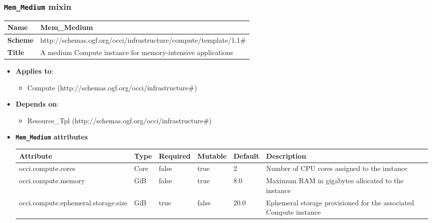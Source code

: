  
\subsubsection{\texttt{Mem\_Medium} mixin}
\begin{center}
\begin{tabular}{|l|l|}
  \hline
  \textbf{Name} & Mem\_Medium \\
  \hline  
  \textbf{Scheme} & http://schemas.ogf.org/occi/infrastructure/compute/template/1.1\# \\
  \hline
  \textbf{Title} & A medium Compute instance for memory-intensive applications \\
  \hline
\end{tabular}
\end{center}
\begin{itemize}
\item \textbf{Applies to}:
\begin{itemize}
	\item Compute (http://schemas.ogf.org/occi/infrastructure\#)
\end{itemize}
\end{itemize} 
\begin{itemize}
\item \textbf{Depends on}:
\begin{itemize}
	\item Resource\_Tpl (http://schemas.ogf.org/occi/infrastructure\#)
\end{itemize}
\end{itemize}

\begin{itemize}
\item \textbf{\texttt{Mem\_Medium} attributes}

\begin{tabularx}{\textwidth}{|l|l|p{1.4cm}|p{1.3cm}|l|X|}
  \hline
  \textbf{Attribute} & \textbf{Type} & \textbf{Required} & \textbf{Mutable} & \textbf{Default} & \textbf{Description} \\
  \hline  
  occi.compute.cores & Core & false & true & 2 & Number of CPU cores assigned to the instance \\
  \hline
  occi.compute.memory & GiB & false & true & 8.0 & Maximum RAM in gigabytes allocated to the instance \\
  \hline
  occi.compute.ephemeral.storage.size & GiB & true & false & 20.0 & Ephemeral storage provisioned for the associated Compute instance \\
  \hline
\end{tabularx}
\end{itemize}


